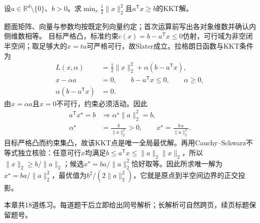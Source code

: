 \begin{example}[原点到半空间的KKT投影]\label{exm:V1-C07-halfspace-kkt}
设$a\in\mathbb R^d\setminus\{0\}$、$b>0$。求$\min_x\tfrac12\|x\|_2^2$且$a^{\mathsf T}x\ge b$的KKT解。
\end{example}
\begin{solution}
\SolGiven 题面矩阵、向量与参数均按既定列向量约定；首次运算前写出各对象维数并确认内侧维数相等。
\SolDerive
目标严格凸，标准约束$c(x)=b-a^{\mathsf T}x\le0$仿射，可行域为非空闭半空间；取足够大的$x=ta$可严格可行，故Slater成立。拉格朗日函数与KKT条件为
\[
\begin{aligned}
L(x,\alpha)&=\frac12\|x\|_2^2+\alpha(b-a^{\mathsf T}x),\\
x-\alpha a&=0,\qquad
b-a^{\mathsf T}x\le0,\qquad
\alpha\ge0,\\
\alpha(b-a^{\mathsf T}x)&=0.
\end{aligned}
\]
由$x=\alpha a$且$x=0$不可行，约束必须活动。因此
\[
\begin{aligned}
a^{\mathsf T}x^\star=b
&\Longrightarrow \alpha^\star\|a\|_2^2=b,\\
\alpha^\star&=\frac{b}{\|a\|_2^2}>0,\qquad
x^\star=\frac{b\,a}{\|a\|_2^2}.
\end{aligned}
\]
目标严格凸而约束集凸，故该KKT点是唯一全局最优解。再用Cauchy--Schwarz不等式独立核验：任意可行$x$均满足$b\le a^{\mathsf T}x\le\|a\|_2\|x\|_2$，所以$\|x\|_2\ge b/\|a\|_2$；候选$x^\star=ba/\|a\|_2^2$恰好取等。因此所求唯一解为$x^\star=ba/\|a\|_2^2$，最优值为$b^2/(2\|a\|_2^2)$，它就是原点到半空间边界的正交投影。
\end{solution}

\begin{chapterexercisebox}
\label{struct:V1-C07-CH34}
\label{struct:V1-C07-CH35}
本章共18道练习。每道题干后立即给出同号解析；长解析可自然跨页，续页标题保留题号。
\end{chapterexercisebox}

